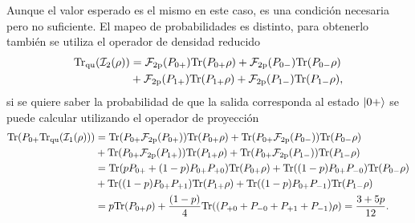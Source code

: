     Aunque el valor esperado es el mismo en este caso, es una condición necesaria pero no suficiente. El mapeo de probabilidades es distinto, para obtenerlo también se utiliza el operador de densidad reducido\[\begin{split}{\rm Tr}_{\text{qu}}(\mathcal{I}_2(\rho))&=\mathcal{F}_{2\text{p}}(P_{0+}){\rm Tr}(P_{0+}\rho)+\mathcal{F}_{2\text{p}}(P_{0-}){\rm Tr}(P_{0-}\rho )\\&+ \mathcal{F}_{2\text{p}}({P_{1+}}){\rm Tr}( P_{1+}\rho)+\mathcal{F}_{2\text{p}}(P_{1-}){\rm Tr}(P_{1-}\rho), \\\end{split}\] si se quiere saber la probabilidad de que la salida corresponda al estado $|0+\rangle$ se puede calcular utilizando el operador de proyección   \[\begin{split}
        {\rm Tr}(P_{0+}{\rm Tr}_{\text{qu}}(\mathcal{I}_1(\rho)))&={\rm Tr}(P_{0+}\mathcal{F}_{2\text{p}}(P_{0+})){\rm Tr}(P_{0+}\rho)+{\rm Tr}(P_{0+}\mathcal{F}_{2\text{p}}(P_{0-})){\rm Tr}(P_{0-}\rho )\\
        &+{\rm Tr}(P_{0+} \mathcal{F}_{2\text{p}}({P_{1+}})){\rm Tr}( P_{1+}\rho)+{\rm Tr}(P_{0+}\mathcal{F}_{2\text{p}}(P_{1-})){\rm Tr}(P_{1-}\rho)\\
        &={\rm Tr}(pP_{0+}+(1-p)P_{0+}P_{+0}){\rm Tr}(P_{0+}\rho)+{\rm Tr}((1-p)P_{0+}P_{-0}){\rm Tr}(P_{0-}\rho )\\
        &+{\rm Tr}((1-p)P_{0+} P_{+1}){\rm Tr}( P_{1+}\rho)+{\rm Tr}((1-p)P_{0+}P_{-1}){\rm Tr}(P_{1-}\rho)\\
        &=p{\rm Tr}(P_{0+}\rho)+\frac{(1-p)}{4}{\rm Tr}((P_{+0}+P_{-0}+P_{+1}+P_{-1})\rho)=\frac{3+5p}{12}.
    \end{split}\]







